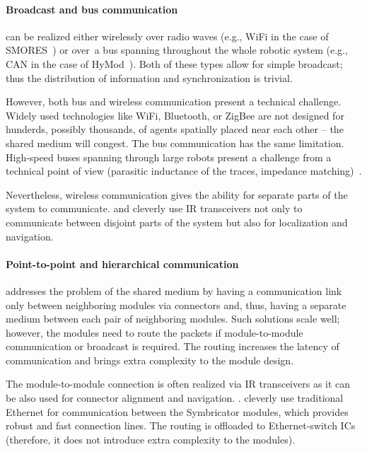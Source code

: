 \paragraph{Broadcast and bus communication} can be realized either
wirelessly over radio waves (e.g., WiFi in the case of
SMORES~\cite{DBLP:conf/iros/DaveyKY12}) or over~a bus spanning throughout the
whole robotic system (e.g., CAN in the case of
HyMod~\cite{DBLP:conf/dars/ParrottDG16}). Both of these types allow for simple
broadcast; thus the distribution of information and synchronization is trivial.

However, both bus and wireless communication present a technical challenge.
Widely used technologies like WiFi, Bluetooth, or ZigBee are not designed for
hunderds, possibly thousands, of agents spatially placed near each other -- the
shared medium will congest. The bus communication has the same limitation.
High-speed buses spanning through large robots present a challenge from
a technical point of view (parasitic inductance of the traces, impedance
matching)~\cite{DBLP:conf/dars/ParrottDG16}.

Nevertheless, wireless communication gives the ability for separate parts of
the system to communicate. \textcite{DBLP:conf/iros/YimSSPDT07a} and
\textcite{DBLP:journals/corr/abs-1109-2288} cleverly use IR transceivers not
only to communicate between disjoint parts of the system but also for
localization and navigation.

\paragraph{Point-to-point and hierarchical communication} addresses the problem
of the shared medium by having a communication link only between neighboring
modules via connectors and, thus, having a separate medium between each pair of
neighboring modules. Such solutions scale well; however, the modules need to
route the packets if module-to-module communication or broadcast is required.
The routing increases the latency of communication and brings extra complexity
to the module design.

The module-to-module connection is often realized via IR transceivers as it can
be also used for connector alignment and navigation.
\cite{DBLP:conf/iros/YimSSPDT07a}. \textcite{DBLP:journals/corr/abs-1109-2288}
cleverly use traditional Ethernet for communication between the Symbricator
modules, which provides robust and fast connection lines. The routing is
offloaded to Ethernet-switch ICs (therefore, it does not introduce extra
complexity to the modules).

